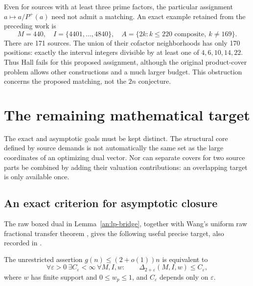 Even for sources with at least three prime factors, the particular
assignment \(a\mapsto a/P^+(a)\) need not admit a matching. An exact
example retained from the preceding work is
\[
 M=440,\quad I=\{4401,\ldots,4840\},\quad
 A=\{2k:k\le220\text{ composite},\ k\ne169\}.
\]
There are 171 sources. The union of their cofactor neighborhoods has
only 170 positions: exactly the interval integers divisible by at
least one of \(4,6,10,14,22\). Thus Hall fails for this proposed
assignment, although the original product-cover problem allows
other constructions and a much larger budget. This obstruction
concerns the proposed matching, not the \(2n\) conjecture.

\section{The remaining mathematical target}
\label{root:remaining}

The exact and asymptotic goals must be kept distinct. The structural
core defined by source demands is not automatically the same set as
the large coordinates of an optimizing dual vector. Nor can separate
covers for two source parts be combined by adding their valuation
contributions: an overlapping target is only available once.

\subsection{An exact criterion for asymptotic closure}

The raw boxed dual in Lemma~\ref{an:lp-bridge}, together with Wang's
uniform raw fractional transfer theorem \cite{Wang}, gives the
following useful precise target, also recorded in \cite{Earlier}.

\begin{proposition}
\label{root:closure-criterion}
The unrestricted assertion \(g(n)\le(2+o(1))n\) is equivalent to
\begin{equation}
 \forall\varepsilon>0\ \exists C_\varepsilon<\infty\
 \forall M,I,w:\qquad
 \Delta_{2+\varepsilon}(M,I,w)\le C_\varepsilon,
 \label{root:closure-target}
\end{equation}
where \(w\) has finite support and \(0\le w_p\le1\), and
\(C_\varepsilon\) depends only on \(\varepsilon\).
\end{proposition}

